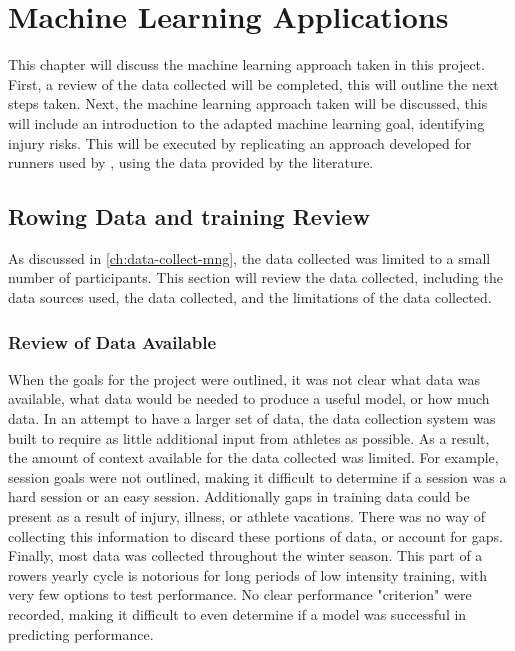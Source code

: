 \chapter{\label{ch:ml}Machine Learning Applications}
This chapter will discuss the machine learning approach taken in this project. First, a review of the data collected will be completed, this will outline the next steps taken. Next, the machine learning approach taken will be discussed, this will include an introduction to the adapted machine learning goal, identifying injury risks. This will be executed by replicating an approach developed for runners used by \textcite{Lovdal2021}, using the data provided by the literature.

\section{Rowing Data and training Review}
As discussed in \autoref{ch:data-collect-mng}, the data collected was limited to a small number of participants. This section will review the data collected, including the data sources used, the data collected, and the limitations of the data collected.
\subsection{Review of Data Available}
When the goals for the project were outlined, it was not clear what data was available, what data would be needed to produce a useful model, or how much data. In an attempt to have a larger set of data, the data collection system was built to require as little additional input from athletes as possible. As a result, the amount of context available for the data collected was limited. For example, session goals were not outlined, making it difficult to determine if a session was a hard session or an easy session. Additionally gaps in training data could be present as a result of injury, illness, or athlete vacations. There was no way of collecting this information to discard these portions of data, or account for gaps. Finally, most data was collected throughout the winter season. This part of a rowers yearly cycle is notorious for long periods of low intensity training, with very few options to test performance. No clear performance "criterion" were recorded, making it difficult to even determine if a model was successful in predicting performance.

